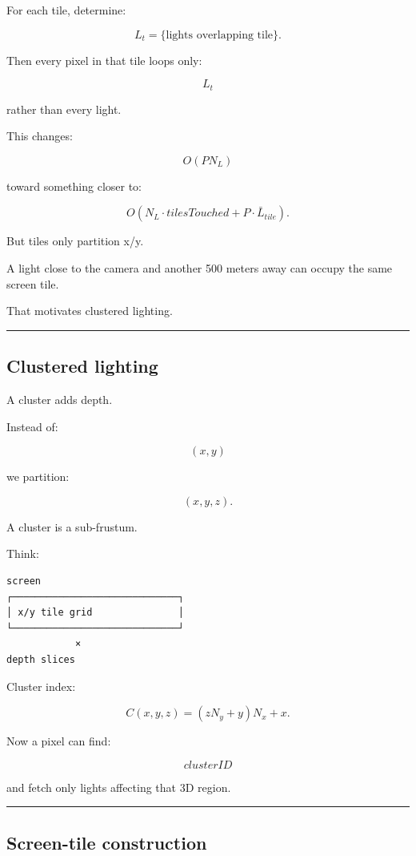 For each tile, determine:

\[
L_t=
\{\text{lights overlapping tile}\}.
\]

Then every pixel in that tile loops only:

\[
L_t
\]

rather than every light.

This changes:

\[
O(PN_L)
\]

toward something closer to:

\[
O(
N_L\cdot tilesTouched
+
P\cdot \bar L_{tile}
).
\]

But tiles only partition x/y.

A light close to the camera and another 500 meters away can occupy the same screen tile.

That motivates clustered lighting.

\begin{center}\rule{0.5\linewidth}{0.5pt}\end{center}

\subsection{Clustered lighting}\label{04-visual-computing-ii-ch040-clustered-lighting}

A cluster adds depth.

Instead of:

\[
(x,y)
\]

we partition:

\[
(x,y,z).
\]

A cluster is a sub-frustum.

Think:

\begin{verbatim}
screen
┌─────────────────────────────┐
│ x/y tile grid               │
└─────────────────────────────┘
            ×
depth slices
\end{verbatim}

Cluster index:

\[
\boxed{
C(x,y,z)
=
(zN_y+y)N_x+x.
}
\]

Now a pixel can find:

\[
clusterID
\]

and fetch only lights affecting that 3D region.

\begin{center}\rule{0.5\linewidth}{0.5pt}\end{center}

\subsection{Screen-tile construction}\label{04-visual-computing-ii-ch040-screen-tile-construction}

